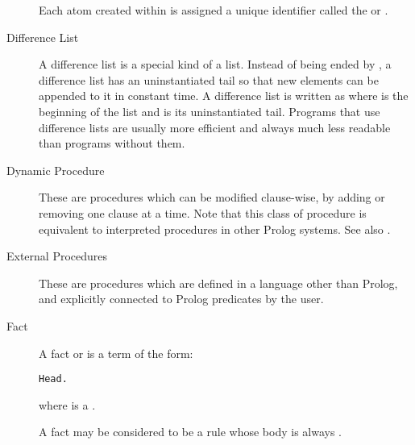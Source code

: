 \begin{description}
\item[]
Each atom created within {\eclipse} is assigned a unique
identifier called the  or .

\item[Difference List]
A difference list is a special kind of a list.
Instead of being ended by , a difference list
has an uninstantiated tail so that new elements
can be appended to it in constant time.
A difference list is written as 
where  is the beginning of the list and 
is its uninstantiated tail.
Programs that use difference lists are usually more efficient
and always much less readable than programs without them.

\item[Dynamic Procedure]
These are procedures which can be modified clause-wise, by adding or removing
one clause at a time. Note that this class of procedure is equivalent to
interpreted procedures in other Prolog systems. See also .


\item[External Procedures]
These are procedures which are defined in a language
other than Prolog, and explicitly connected to Prolog predicates by the user.

\item[Fact]
A fact or  is a term of the form:
\begin{verbatim}
Head.
\end{verbatim}
where  is a .

A fact may be considered to be a rule whose body is always .


\end{description}
